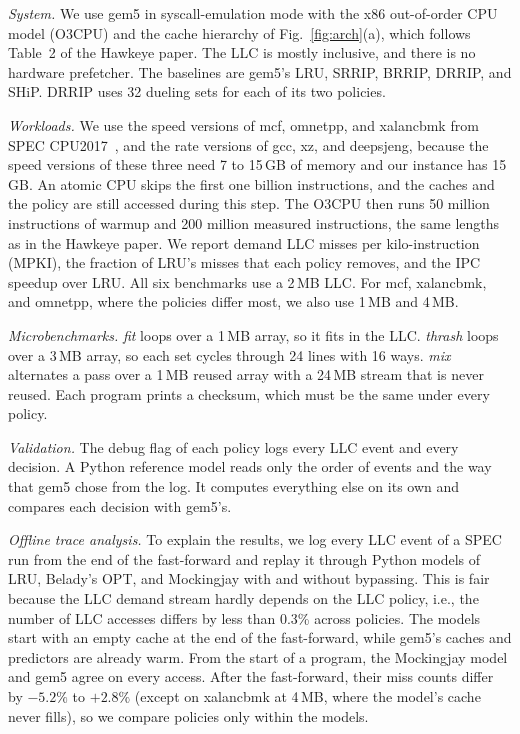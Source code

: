 \documentclass[11pt,conference]{IEEEtran}
\begin{document}
\emph{System.} We use gem5 in syscall-emulation mode with the x86 out-of-order
CPU model (O3CPU) and the cache hierarchy of Fig.~\ref{fig:arch}(a), which
follows Table~2 of the Hawkeye paper. The LLC is mostly inclusive, and there is
no hardware prefetcher. The baselines are gem5's LRU, SRRIP, BRRIP, DRRIP, and
SHiP. DRRIP uses 32 dueling sets for each of its two policies.

\emph{Workloads.} We use the speed versions of mcf, omnetpp, and xalancbmk from
SPEC CPU2017~\cite{spec17}, and the rate versions of gcc, xz, and deepsjeng,
because the speed versions of these three need 7 to 15\,GB of memory and our
instance has 15\,GB. An atomic CPU skips the first one billion instructions,
and the caches and the policy are still accessed during this step. The O3CPU
then runs 50 million instructions of warmup and 200 million measured
instructions, the same lengths as in the Hawkeye paper. We report demand LLC
misses per kilo-instruction (MPKI), the fraction of LRU's misses that each
policy removes, and the IPC speedup over LRU. All six benchmarks use a 2\,MB
LLC. For mcf, xalancbmk, and omnetpp, where the policies differ most, we also
use 1\,MB and 4\,MB.

\emph{Microbenchmarks.} \emph{fit} loops over a 1\,MB array, so it fits in the
LLC. \emph{thrash} loops over a 3\,MB array, so each set cycles through 24 lines
with 16 ways. \emph{mix} alternates a pass over a 1\,MB reused array with a
24\,MB stream that is never reused. Each program prints a checksum, which must
be the same under every policy.

\emph{Validation.} The debug flag of each policy logs every LLC event and every
decision. A Python reference model reads only the order of events and the way
that gem5 chose from the log. It computes everything else on its own and
compares each decision with gem5's.

\emph{Offline trace analysis.} To explain the results, we log every LLC event
of a SPEC run from the end of the fast-forward and replay it through Python
models of LRU, Belady's OPT, and Mockingjay with and without bypassing. This is
fair because the LLC demand stream hardly depends on the LLC policy, i.e., the
number of LLC accesses differs by less than 0.3\% across policies. The models
start with an empty cache at the end of the fast-forward, while gem5's caches
and predictors are already warm. From the start of a program, the Mockingjay
model and gem5 agree on every access. After the fast-forward, their miss counts
differ by $-5.2\%$ to $+2.8\%$ (except on xalancbmk at 4\,MB, where the
model's cache never fills), so we compare policies only within the models.
\end{document}
